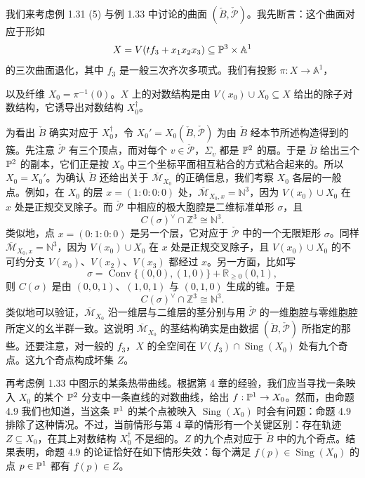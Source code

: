 \begin{example}
我们来考虑例 1.31 (5) 与例 1.33 中讨论的曲面 $(\check B,\check{\mathcal{P}})$。我先断言：这个曲面对应于形如
\[
  X=V(tf_3+x_1x_2x_3)\subseteq\mathbb{P}^3\times\mathbb{A}^1
\]
的三次曲面退化，其中 $f_3$ 是一般三次齐次多项式。我们有投影 $\pi:X\to\mathbb{A}^1$，

以及纤维 $X_0=\pi^{-1}(0)$。$X$ 上的对数结构是由 $V(x_0)\cup X_0\subseteq X$ 给出的除子对数结构，它诱导出对数结构 $X_0^{\dagger}$。

为看出 $\check B$ 确实对应于 $X_0^{\dagger}$，令 $X_0'=X_0(\check B,\check{\mathcal{P}})$ 为由 $\check B$ 经本节所述构造得到的簇。先注意 $\check{\mathcal{P}}$ 有三个顶点，而对每个 $v\in\check{\mathcal{P}}$，$\Sigma_v$ 都是 $\mathbb{P}^2$ 的扇。于是 $\check B$ 给出三个 $\mathbb{P}^2$ 的副本，它们正是按 $X_0$ 中三个坐标平面相互粘合的方式粘合起来的。所以 $X_0=X_0'$。为确认 $\check B$ 还给出关于 $\overline{\mathcal{M}}_{X_0}$ 的正确信息，我们考察 $X_0$ 各层的一般点。例如，在 $X_0$ 的层 $x=(1:0:0:0)$ 处，$\overline{\mathcal{M}}_{X_0,x}=\mathbb{N}^3$，因为 $V(x_0)\cup X_0$ 在 $x$ 处是正规交叉除子。而 $\check{\mathcal{P}}$ 中相应的极大胞腔是二维标准单形 $\sigma$，且
\[
  C(\sigma)^{\vee}\cap\mathbb{Z}^3\cong\mathbb{N}^3.
\]
类似地，点 $x=(0:1:0:0)$ 是另一个层，它对应于 $\check{\mathcal{P}}$ 中的一个无限矩形 $\sigma$。同样 $\overline{\mathcal{M}}_{X_0,x}=\mathbb{N}^3$，因为 $V(x_0)\cup X_0$ 在 $x$ 处是正规交叉除子，且 $V(x_0)\cup X_0$ 的不可约分支 $V(x_0)$、$V(x_2)$、$V(x_3)$ 都经过 $x$。另一方面，比如写
\[
  \sigma=\operatorname{Conv}\{(0,0),(1,0)\}+\mathbb{R}_{\ge0}(0,1),
\]
则 $C(\sigma)$ 是由 $(0,0,1)$、$(1,0,1)$ 与 $(0,1,0)$ 生成的锥。于是
\[
  C(\sigma)^{\vee}\cap\mathbb{Z}^3\cong\mathbb{N}^3.
\]
类似地可以验证，$\overline{\mathcal{M}}_{X_0}$ 沿一维层与二维层的茎分别与用 $\check{\mathcal{P}}$ 的一维胞腔与零维胞腔所定义的幺半群一致。这说明 $\overline{\mathcal{M}}_{X_0}$ 的茎结构确实是由数据 $(\check B,\check{\mathcal{P}})$ 所指定的那些。还要注意，对一般的 $f_3$，$X$ 的全空间在 $V(f_3)\cap\operatorname{Sing}(X_0)$ 处有九个奇点。这九个奇点构成坏集 $Z$。

再考虑例 1.33 中图示的某条热带曲线。根据第 4 章的经验，我们应当寻找一条映入 $X_0$ 的某个 $\mathbb{P}^2$ 分支中一条直线的对数曲线，给出 $f:\mathbb{P}^1\to X_0$。然而，由命题 4.9 我们也知道，当这条 $\mathbb{P}^1$ 的某个点被映入 $\operatorname{Sing}(X_0)$ 时会有问题：命题 4.9 排除了这种情况。不过，当前情形与第 4 章的情形有一个关键区别：存在轨迹 $Z\subseteq X_0$，在其上对数结构 $X_0^{\dagger}$ 不是细的。$Z$ 的九个点对应于 $\check B$ 中的九个奇点。结果表明，命题 4.9 的论证恰好在如下情形失效：每个满足 $f(p)\in\operatorname{Sing}(X_0)$ 的点 $p\in\mathbb{P}^1$ 都有 $f(p)\in Z$。


\end{example}

